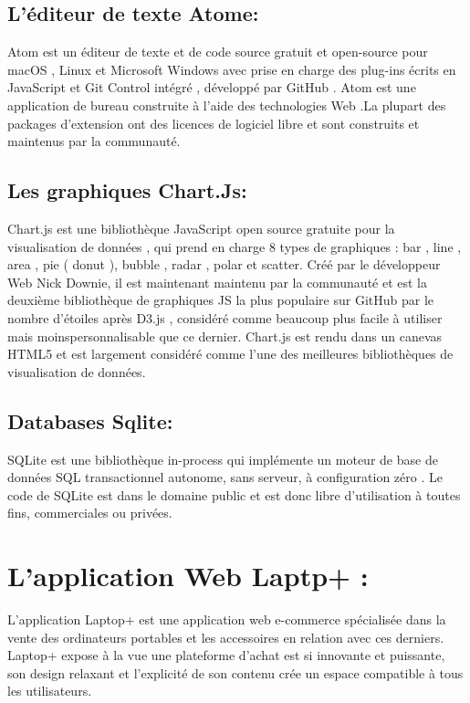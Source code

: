\documentclass[a4paper]{report}
\begin{document}
\begin{doublespace}
\begin{doublespace}
\begin{doublespace}
\begin{doublespace}
\begin{doublespace}
\begin{doublespace}
\subsection{L'éditeur de texte Atome:} 
 \begin{figure}[H]
\end{figure}
 Atom est un éditeur de texte et de code source gratuit et open-source pour macOS , Linux et Microsoft Windows avec prise en charge des plug-ins écrits en JavaScript et Git Control intégré , développé par GitHub . Atom est une application de bureau construite à l'aide des technologies Web .La plupart des packages d'extension ont des licences de logiciel libre et sont construits et maintenus par la communauté. 
  \newpage
\subsection{ Les graphiques Chart.Js:}  
   \begin{figure}[H]
\end{figure}
 Chart.js est une bibliothèque JavaScript open source gratuite pour la visualisation de données , qui prend en charge 8 types de graphiques : bar , line , area , pie ( donut ), bubble , radar , polar et scatter. Créé par le développeur Web  Nick Downie, il est maintenant maintenu par la communauté et est la deuxième bibliothèque de graphiques JS la plus populaire sur GitHub par le nombre d'étoiles après D3.js , considéré comme beaucoup plus facile à utiliser mais moinspersonnalisable que ce dernier. Chart.js est rendu dans un canevas HTML5 et est largement considéré comme l'une des meilleures bibliothèques de visualisation de données. 
\subsection{Databases Sqlite:}
\begin{figure}[H]
\end{figure}
SQLite est une bibliothèque in-process qui implémente un moteur de base de données SQL transactionnel autonome, sans serveur, à configuration zéro . Le code de SQLite est dans le domaine public et est donc libre d'utilisation à toutes fins, commerciales ou privées.
\newpage
\section{L'application Web Laptp+ :} 
L'application Laptop+ est une application web e-commerce spécialisée dans la vente des ordinateurs portables et les accessoires en relation avec ces derniers. \\Laptop+ expose à la vue une plateforme d'achat est si innovante et puissante, son design relaxant et l’explicité de son contenu crée un espace compatible à tous les utilisateurs.


\end{doublespace}
\end{doublespace}
\end{doublespace}
\end{doublespace}
\end{doublespace}
\end{doublespace}
\end{document}

